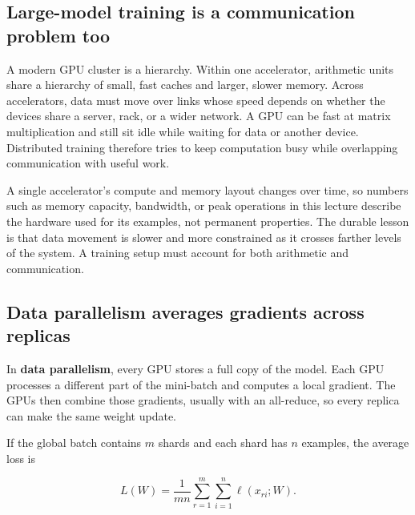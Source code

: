 \hypertarget{04-visual-computing-ii-ch031-scaling-model-training-across-hardware}{}

\subsection{Large-model training is a communication problem too}\label{04-visual-computing-ii-ch031-large-model-training-is-a-communication-problem-too}

\hypertarget{04-visual-computing-ii-ch031-large-model-training-is-a-communication-problem-too}{}

A modern GPU cluster is a hierarchy. Within one accelerator, arithmetic units share a hierarchy of small, fast caches and larger, slower memory. Across accelerators, data must move over links whose speed depends on whether the devices share a server, rack, or a wider network. A GPU can be fast at matrix multiplication and still sit idle while waiting for data or another device. Distributed training therefore tries to keep computation busy while overlapping communication with useful work.

A single accelerator's compute and memory layout changes over time, so numbers such as memory capacity, bandwidth, or peak operations in this lecture describe the hardware used for its examples, not permanent properties. The durable lesson is that data movement is slower and more constrained as it crosses farther levels of the system. A training setup must account for both arithmetic and communication.

\subsection{Data parallelism averages gradients across replicas}\label{04-visual-computing-ii-ch031-data-parallelism-averages-gradients-across-replicas}

\hypertarget{04-visual-computing-ii-ch031-data-parallelism-averages-gradients-across-replicas}{}

In \textbf{data parallelism}, every GPU stores a full copy of the model. Each GPU processes a different part of the mini-batch and computes a local gradient. The GPUs then combine those gradients, usually with an all-reduce, so every replica can make the same weight update.

If the global batch contains \(m\) shards and each shard has \(n\) examples, the average loss is

\[
L(W)=\frac{1}{mn}\sum_{r=1}^{m}\sum_{i=1}^{n}\ell(x_{ri};W).
\]

